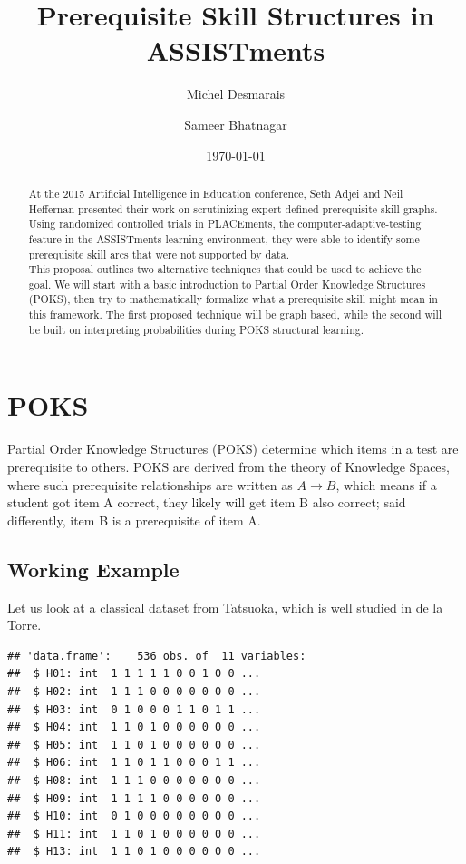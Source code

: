 \documentclass[11pt]{article}\usepackage[]{graphicx}\usepackage[]{color}
\makeatletter
\newenvironment{kframe}{%
 \def\at@end@of@kframe{}%
 \ifinner\ifhmode%
  \def\at@end@of@kframe{\end{minipage}}%
  \begin{minipage}{\columnwidth}%
 \fi\fi%
 \def\FrameCommand##1{\hskip\@totalleftmargin \hskip-\fboxsep
 \colorbox{shadecolor}{##1}\hskip-\fboxsep
     \hskip-\linewidth \hskip-\@totalleftmargin \hskip\columnwidth}%
 \MakeFramed {\advance\hsize-\width
   \@totalleftmargin\z@ \linewidth\hsize
   \@setminipage}}%
 {\par\unskip\endMakeFramed%
 \at@end@of@kframe}
\newenvironment{knitrout}{}{} %
\makeatother
\begin{document}

\title{Prerequisite Skill Structures in ASSISTments}
\author{Michel Desmarais \and Sameer Bhatnagar}
\date{\today}
\maketitle






\begin{abstract}
At the 2015 Artificial Intelligence in Education conference, Seth Adjei and Neil Heffernan presented their work on scrutinizing expert-defined prerequisite skill graphs. Using randomized controlled trials in PLACEments, the computer-adaptive-testing feature in the ASSISTments learning environment, they were able to identify some prerequisite skill arcs that were not supported by data.\\
This proposal outlines two alternative techniques that could be used to achieve the goal. We will start with a basic introduction to Partial Order Knowledge Structures (POKS), then try to mathematically formalize what a prerequisite skill might mean in this framework. The first proposed technique will be graph based, while the second will be built on interpreting probabilities during POKS structural learning.
\end{abstract}

\section{POKS}
Partial Order Knowledge Structures (POKS) determine which items in a test are prerequisite to others. POKS are derived from the theory of Knowledge Spaces, where such prerequisite relationships are written as $A \to B $, which means if a student got item A correct, they likely will get item B also correct; said differently, item B is a prerequisite of item A.

\subsection{Working Example}
Let us look at a classical dataset from Tatsuoka, which is well studied in de la Torre. 
\begin{knitrout}
\color{fgcolor}\begin{kframe}
\begin{verbatim}
## 'data.frame':	536 obs. of  11 variables:
##  $ H01: int  1 1 1 1 1 0 0 1 0 0 ...
##  $ H02: int  1 1 1 0 0 0 0 0 0 0 ...
##  $ H03: int  0 1 0 0 0 1 1 0 1 1 ...
##  $ H04: int  1 1 0 1 0 0 0 0 0 0 ...
##  $ H05: int  1 1 0 1 0 0 0 0 0 0 ...
##  $ H06: int  1 1 0 1 1 0 0 0 1 1 ...
##  $ H08: int  1 1 1 0 0 0 0 0 0 0 ...
##  $ H09: int  1 1 1 1 0 0 0 0 0 0 ...
##  $ H10: int  0 1 0 0 0 0 0 0 0 0 ...
##  $ H11: int  1 1 0 1 0 0 0 0 0 0 ...
##  $ H13: int  1 1 0 1 0 0 0 0 0 0 ...
\end{verbatim}
\end{kframe}
\end{knitrout}
\end{document}
